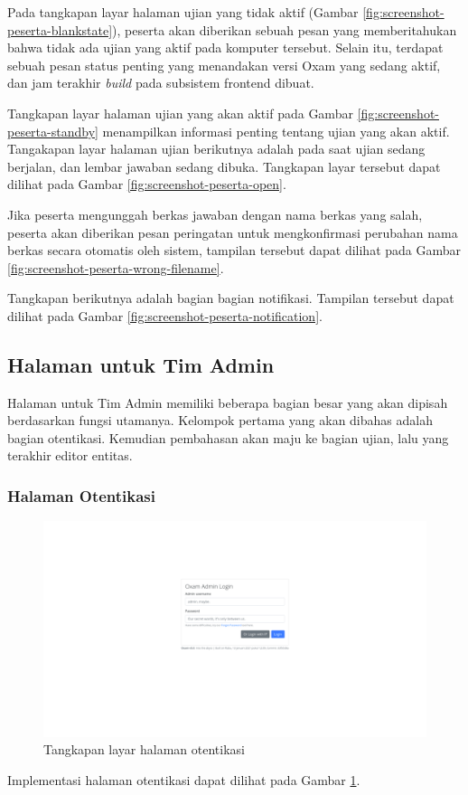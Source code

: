         Pada tangkapan layar halaman ujian yang tidak aktif (Gambar \ref{fig:screenshot-peserta-blankstate}), 
        peserta akan diberikan sebuah pesan
        yang memberitahukan bahwa tidak ada ujian yang aktif pada komputer tersebut. Selain itu, terdapat
        sebuah pesan status penting yang menandakan versi Oxam yang sedang aktif, dan jam terakhir
        \textit{build} pada subsistem frontend dibuat.
        
        Tangkapan layar halaman ujian yang akan aktif pada Gambar \ref{fig:screenshot-peserta-standby} menampilkan
        informasi penting tentang ujian yang akan aktif. Tangakapan layar halaman ujian berikutnya adalah pada saat ujian sedang berjalan, dan lembar jawaban
        sedang dibuka. Tangkapan layar tersebut dapat dilihat pada Gambar \ref{fig:screenshot-peserta-open}.
        
        Jika peserta mengunggah berkas jawaban dengan nama berkas yang salah, peserta akan diberikan pesan peringatan untuk
        mengkonfirmasi perubahan nama berkas secara otomatis oleh sistem, tampilan tersebut dapat dilihat pada
        Gambar \ref{fig:screenshot-peserta-wrong-filename}.
        
        Tangkapan berikutnya adalah bagian bagian notifikasi. Tampilan tersebut dapat dilihat pada Gambar
        \ref{fig:screenshot-peserta-notification}.
        
    \subsection{Halaman untuk Tim Admin}
    Halaman untuk Tim Admin memiliki beberapa bagian besar yang akan dipisah berdasarkan fungsi utamanya.
    Kelompok pertama yang akan dibahas adalah bagian otentikasi. Kemudian pembahasan akan maju ke bagian
    ujian, lalu yang terakhir editor entitas.
    
    \subsubsection{Halaman Otentikasi}
    \begin{figure}
        \centering
        \includegraphics[width=0.7\paperwidth]{Gambar/implemented-interface/admin/login.png}
        \caption{Tangkapan layar halaman otentikasi}
        \label{fig:screenshot-admin-authentication}
    \end{figure}
    Implementasi halaman otentikasi dapat dilihat pada Gambar \ref{fig:screenshot-admin-authentication}.
    
